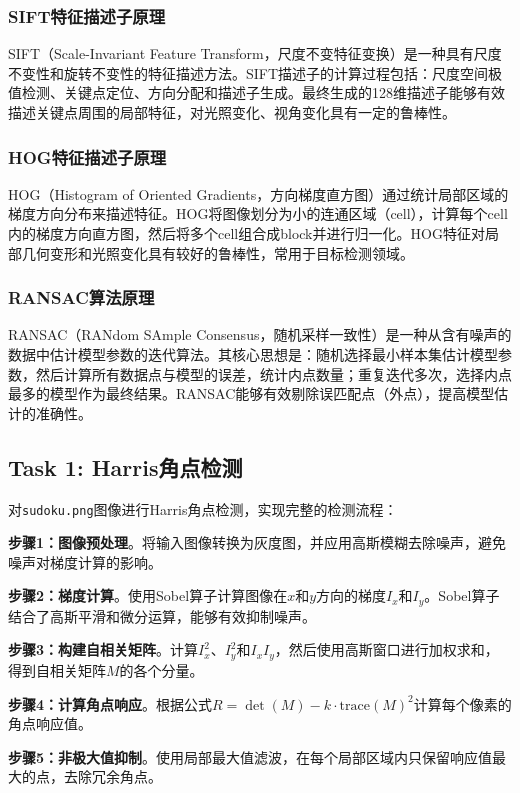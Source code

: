 \documentclass[a4paper]{article}
\begin{document}
\subsubsection{SIFT特征描述子原理}
SIFT（Scale-Invariant Feature Transform，尺度不变特征变换）是一种具有尺度不变性和旋转不变性的特征描述方法。SIFT描述子的计算过程包括：尺度空间极值检测、关键点定位、方向分配和描述子生成。最终生成的128维描述子能够有效描述关键点周围的局部特征，对光照变化、视角变化具有一定的鲁棒性。

\subsubsection{HOG特征描述子原理}
HOG（Histogram of Oriented Gradients，方向梯度直方图）通过统计局部区域的梯度方向分布来描述特征。HOG将图像划分为小的连通区域（cell），计算每个cell内的梯度方向直方图，然后将多个cell组合成block并进行归一化。HOG特征对局部几何变形和光照变化具有较好的鲁棒性，常用于目标检测领域。

\subsubsection{RANSAC算法原理}
RANSAC（RANdom SAmple Consensus，随机采样一致性）是一种从含有噪声的数据中估计模型参数的迭代算法。其核心思想是：随机选择最小样本集估计模型参数，然后计算所有数据点与模型的误差，统计内点数量；重复迭代多次，选择内点最多的模型作为最终结果。RANSAC能够有效剔除误匹配点（外点），提高模型估计的准确性。

\subsection{Task 1: Harris角点检测}
对\texttt{sudoku.png}图像进行Harris角点检测，实现完整的检测流程：

\textbf{步骤1：图像预处理}。将输入图像转换为灰度图，并应用高斯模糊去除噪声，避免噪声对梯度计算的影响。

\textbf{步骤2：梯度计算}。使用Sobel算子计算图像在$x$和$y$方向的梯度$I_x$和$I_y$。Sobel算子结合了高斯平滑和微分运算，能够有效抑制噪声。

\textbf{步骤3：构建自相关矩阵}。计算$I_x^2$、$I_y^2$和$I_x I_y$，然后使用高斯窗口进行加权求和，得到自相关矩阵$M$的各个分量。

\textbf{步骤4：计算角点响应}。根据公式$R = \det(M) - k \cdot \text{trace}(M)^2$计算每个像素的角点响应值。

\textbf{步骤5：非极大值抑制}。使用局部最大值滤波，在每个局部区域内只保留响应值最大的点，去除冗余角点。
\end{document}
